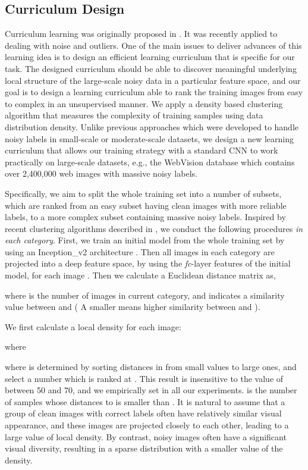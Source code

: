 \documentclass[runningheads]{llncs}
\begin{document}
\subsection{Curriculum Design}

Curriculum learning was originally proposed in \cite{bengio2009curriculum}. It was recently applied to dealing with noise and outliers. One of the main issues to deliver advances of this learning idea is to design an efficient learning curriculum that is specific for our task. The designed curriculum should be able to discover meaningful underlying local structure of the large-scale noisy data in a particular feature space, and our goal is to design a learning curriculum able to rank the training images from easy to complex  in an unsupervised manner. We apply a density based clustering algorithm that measures the complexity of training samples using data distribution density. Unlike previous approaches which were developed to handle noisy labels in small-scale or moderate-scale datasets, we design a new learning curriculum that allows our training strategy with a standard CNN to work practically on large-scale datasets, e.g., the WebVision database which contains over 2,400,000 web images with massive noisy labels.

Specifically, we aim to split the whole training set into a number of subsets, which are ranked from an easy subset having clean images with more reliable labels, to a more complex subset containing massive noisy labels. Inspired by recent clustering algorithms described in \cite{rodriguez2014clustering},  we conduct the following procedures \emph{in each category}. First, we train an initial model from the whole training set by using an Inception\_v2 architecture \cite{ioffe2015batch}. Then all images in each category are projected into a deep feature space, by using the \emph{fc}-layer features of the initial model,  for each image . Then we calculate a Euclidean distance matrix  as,

where  is the number of images in current category, and  indicates a similarity value between  and ( A smaller  means higher similarity between  and  ).

We first calculate a local density  for each image:

where

where  is determined by sorting  distances in  from small values to large ones, and select a number which is ranked at . This result is insensitive to the value of  between 50 and 70, and we empirically set  in all our experiments.  is the number of samples whose distances to  is smaller than . It is natural to assume that a group of clean images with correct labels often have relatively similar visual appearance, and these images are projected closely to each other, leading to a large value of local density. By contrast, noisy images often have a significant visual diversity, resulting in a sparse distribution with a smaller value of the density.
\end{document}
